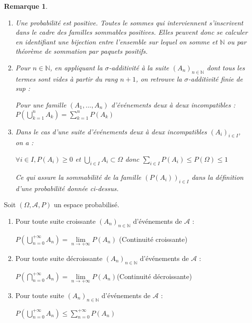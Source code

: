 \documentclass[a4paper,12pt]{book}
\newcommand{\Thr}[2]{\begin{tcolorbox}[sharp corners, colback=white,colframe=red!90!black!75, title=Théorème : #1]#2\end{tcolorbox}}
\newtheorem{Rem}{Remarque}[section]
\def\N{\mathbb{N}}
\begin{document}
\begin{Rem}\begin{enumerate}
\item Une probabilité est positive. Toutes le sommes qui interviennent s'inscrivent dans le cadre des familles sommables positives. Elles peuvent donc se calculer en identifiant une bijection entre l'ensemble sur lequel on somme et $\N$ ou par théorème de sommation par paquets positifs.
\item Pour $n\in\N$, en appliquant la $\sigma$-additivité à la suite $(A_n)_{n\in\N}$ dont tous les termes sont vides à partir du rang $n+1$, on retrouve la $\sigma$-additivité finie de sup :
\par Pour une famille $(A_1,...,A_n)$ d'événements deux à deux incompatibles : $P\left(\bigcup_{k=1}^nA_k\right) =\sum\limits_{k=1}^nP(A_k)$
\item Dans le cas d'une suite d'événements deux à deux incompatibles $(A_i)_{i\in I}$, on a :
\par \begin{center} $\forall i\in I, P(A_i)\geq 0$ et $\bigcup_{i\in I}A_i\subset\Omega$ donc $\sum\limits_{i\in I}P(A_i)\leq P(\Omega)\leq 1$\end{center}
\par Ce qui assure la sommabilité de la famille $(P(A_i))_{i\in I}$ dans la définition d'une probabilité donnée ci-dessus.
\end{enumerate}\end{Rem}
\Thr{}{Soit $(\Omega, \mathcal{A},P)$ un espace probabilisé.\begin{enumerate}
\item Pour toute suite croissante $(A_n)_{n\in\N}$ d'événements de $\mathcal{A}$ : \par\begin{center}$P\left(\bigcup_{n=0}^{+\infty}A_n\right)=\lim\limits_{n\to+\infty}P(A_n)$ (Continuité croissante)\end{center}
\item Pour toute suite décroissante $(A_n)_{n\in\N}$ d'événements de $\mathcal{A}$ : \par\begin{center}$P\left(\bigcap_{n=0}^{+\infty}A_n\right)=\lim\limits_{n\to+\infty}P(A_n)$(Continuité décroissante)\end{center}
\item Pour toute suite $(A_n)_{n\in\N}$ d'événements de $\mathcal{A}$ :\par\begin{center}$P\left(\bigcup_{n=0}^{+\infty}A_n\right)\leq\sum\limits_{n=0}^{+\infty}P(A_n)$\end{center}
\end{enumerate}}
\end{document}
